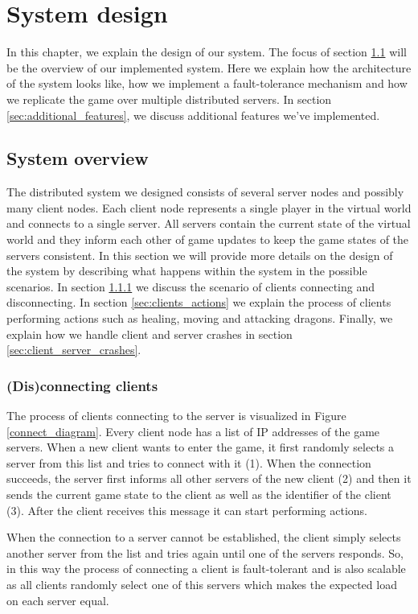 \section{System design}
In this chapter, we explain the design of our system. The focus of section \ref{sec:system_overview} will be the overview of our implemented system. Here we explain how the architecture of the system looks like, how we implement a fault-tolerance mechanism and how we replicate the game over multiple distributed servers. In section \ref{sec:additional_features}, we discuss additional features we've implemented.

\subsection{System overview}
\label{sec:system_overview}
The distributed system we designed consists of several server nodes and possibly many client nodes. Each client node represents a single player in the virtual world and connects to a single server. All servers contain the current state of the virtual world and they inform each other of game updates to keep the game states of the servers consistent. In this section we will provide more details on the design of the system by describing what happens within the system in the possible scenarios. In section \ref{sec:disconnecting_clients} we discuss the scenario of clients connecting and disconnecting. In section \ref{sec:clients_actions} we explain the process of clients performing actions such as healing, moving and attacking dragons. Finally, we explain how we handle client and server crashes in section \ref{sec:client_server_crashes}.

\subsubsection{(Dis)connecting clients}
\label{sec:disconnecting_clients}
The process of clients connecting to the server is visualized in Figure \ref{connect_diagram}. Every client node has a list of IP addresses of the game servers. When a new client wants to enter the game, it first randomly selects a server from this list and tries to connect with it (1). When the connection succeeds, the server first informs all other servers of the new client (2) and then it sends the current game state to the client as well as the identifier of the client (3). After the client receives this message it can start performing actions.

When the connection to a server cannot be established, the client simply selects another server from the list and tries again until one of the servers responds. So, in this way the process of connecting a client is fault-tolerant and is also scalable as all clients randomly select one of this servers which makes the expected load on each server equal.

